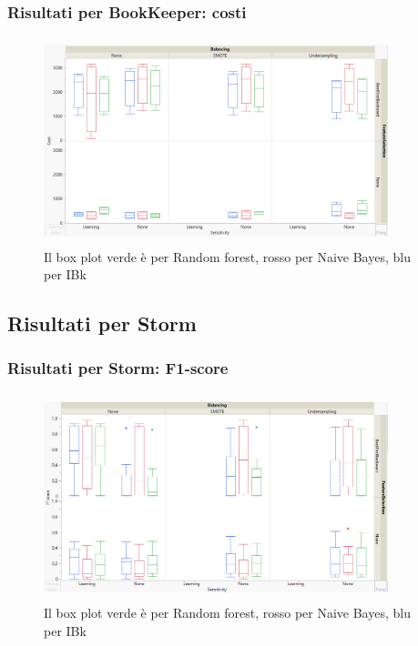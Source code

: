 \documentclass{beamer}
\begin{document}
\begin{frame}
	\frametitle{Risultati per BookKeeper: costi}
	
	\centering
	\begin{figure}
	\includegraphics[width=10cm, height=6cm]{bookkeeper-cost}
	\caption{Il box plot verde è per Random forest, rosso per Naive Bayes, blu per IBk}
	\end{figure}
\end{frame}

\subsection{Risultati per Storm}
\begin{frame}
	\frametitle{Risultati per Storm: F1-score}
	
	\centering
	\begin{figure}
	\includegraphics[width=10cm, height=6cm]{storm-f1score}
	\caption{Il box plot verde è per Random forest, rosso per Naive Bayes, blu per IBk}
	\end{figure}
\end{frame}
\end{document}
